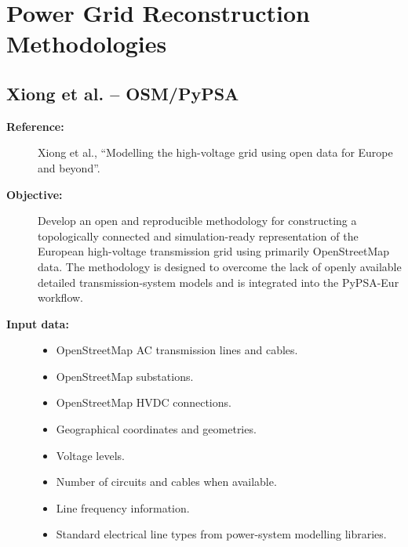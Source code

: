 \chapter{Power Grid Reconstruction Methodologies}

\section{Xiong et al. -- OSM/PyPSA}

\begin{description}

    \item[\textbf{Reference:}]
    Xiong et al., ``Modelling the high-voltage grid using open data for
    Europe and beyond''.

    \item[\textbf{Objective:}]
    Develop an open and reproducible methodology for constructing a
    topologically connected and simulation-ready representation of the
    European high-voltage transmission grid using primarily OpenStreetMap
    data. The methodology is designed to overcome the lack of openly
    available detailed transmission-system models and is integrated into
    the PyPSA-Eur workflow.

    \item[\textbf{Input data:}] \hfill
    \begin{itemize}
        \item OpenStreetMap AC transmission lines and cables.
        \item OpenStreetMap substations.
        \item OpenStreetMap HVDC connections.
        \item Geographical coordinates and geometries.
        \item Voltage levels.
        \item Number of circuits and cables when available.
        \item Line frequency information.
        \item Standard electrical line types from power-system modelling
        libraries.
    \end{itemize}


\end{description}
